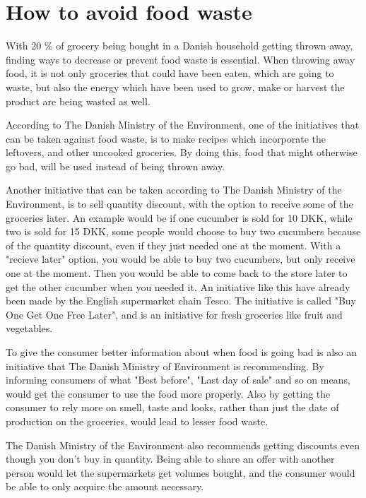 \section{How to avoid food waste} \label{HowToAvoidFoodWaste}
With 20 \% of grocery being bought in a Danish household getting thrown away, finding ways to decrease or prevent food waste is essential. When throwing away food, it is not only groceries that could have been eaten, which are going to waste, but also the energy which have been used to grow, make or harvest the product are being wasted as well.

According to The Danish Ministry of the Environment\cite{madSpild_Notat}, one of the initiatives that can be taken against food waste, is to make recipes which incorporate the leftovers, and other uncooked groceries. By doing this, food that might otherwise go bad, will be used instead of being thrown away.

Another initiative that can be taken according to The Danish Ministry of the Environment, is to sell quantity discount, with the option to receive some of the groceries later. An example would be if one cucumber is sold for 10 DKK, while two is sold for 15 DKK, some people would choose to buy two cucumbers because of the quantity discount, even if they just needed one at the moment. With a "recieve later" option, you would be able to buy two cucumbers, but only receive one at the moment. Then you would be able to come back to the store later to get the other cucumber when you needed it. An initiative like this have already been made by the English supermarket chain Tesco. The initiative is called "Buy One Get One Free Later", and is an initiative for fresh groceries like fruit and vegetables.

To give the consumer better information about when food is going bad is also an initiative that The Danish Ministry of Environment is recommending. By informing consumers of what "Best before", "Last day of sale" and so on means, would get the consumer to use the food more properly. Also by getting the consumer to rely more on smell, taste and looks, rather than just the date of production on the groceries, would lead to lesser food waste.

The Danish Ministry of the Environment also recommends getting discounts even though you don't buy in quantity. Being able to share an offer with another person would let the supermarkets get volumes bought, and the consumer would be able to only acquire the amount necessary.

